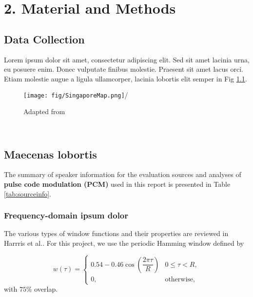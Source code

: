 \chapter{2. Material and Methods}
\section{Data Collection}

Lorem ipsum dolor sit amet, consectetur adipiscing elit. Sed sit amet lacinia urna, eu posuere enim. Donec vulputate finibus molestie. Praesent sit amet lacus orci. Etiam molestie augue a ligula ullamcorper, lacinia lobortis elit semper in Fig \ref{fig:singmap}. %

\begin{figure}[!htb]
    \centering
    \texttt{[image: fig/SingaporeMap.png]}/
    \caption[Singapore Map] \\{\footnotesize Adapted from \cite{sapp_2004}}
    \label{fig:singmap} %
\end{figure}

\section{Maecenas lobortis}


The summary of speaker information for the evaluation sources and analyses of \textbf{pulse code modulation (PCM)} used in this report is presented in Table \ref{tab:sourceinfo}. %


\subsection{Frequency-domain ipsum dolor}
The various types of window functions and their properties are reviewed in Harrris et al.\parencite*{harris1978use}. For this project, we use the periodic Hamming window defined by

\begin{equation}
    w(\tau) = \begin{cases}
    0.54 - 0.46\cos\left(\dfrac{2\pi\tau}{R}\right)& 0 \le \tau < R,\\
    0, & \text{otherwise,}
    \end{cases}
\end{equation}
with $75\%$ overlap.


